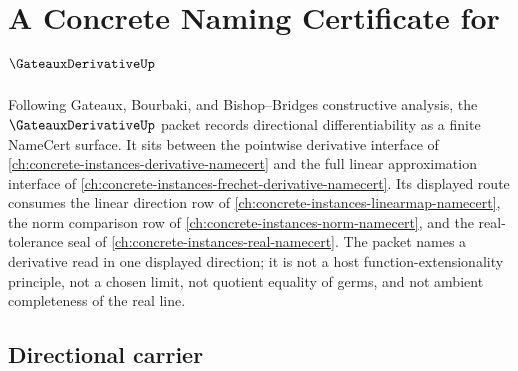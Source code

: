 \chapter{A Concrete Naming Certificate for $\GateauxDerivativeUp$}
\label{ch:concrete-instances-gateaux-derivative-namecert}

Following Gateaux, Bourbaki, and Bishop--Bridges constructive analysis, the $\GateauxDerivativeUp$ packet records directional differentiability as a finite NameCert surface. It sits between the pointwise derivative interface of \autoref{ch:concrete-instances-derivative-namecert} and the full linear approximation interface of \autoref{ch:concrete-instances-frechet-derivative-namecert}. Its displayed route consumes the linear direction row of \autoref{ch:concrete-instances-linearmap-namecert}, the norm comparison row of \autoref{ch:concrete-instances-norm-namecert}, and the real-tolerance seal of \autoref{ch:concrete-instances-real-namecert}. The packet names a derivative read in one displayed direction; it is not a host function-extensionality principle, not a chosen limit, not quotient equality of germs, and not ambient completeness of the real line.

\section{Directional carrier}
\label{sec:gateaux-derivative-carrier}

